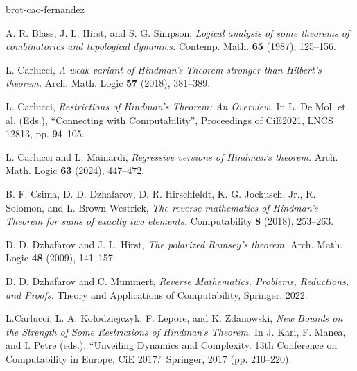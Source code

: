 \documentclass[11pt]{amsart}
\theoremstyle{definition}
\begin{document}
\begin{thebibliography}{brot-cao-fernandez}

A. R. Blass, J. L. Hirst, and S. G. Simpson,
{\em Logical analysis of some theorems of combinatorics and topological dynamics.}
Contemp. Math.
{\bf 65} (1987), 125--156.

L. Carlucci,
{\em A weak variant of Hindman's Theorem stronger than Hilbert's theorem.}
Arch. Math. Logic
{\bf 57} (2018), 381--389.

L. Carlucci,
{\em Restrictions of Hindman's Theorem: An Overview.}
In L. De Mol. et al. (Eds.),
``Connecting with Computability'', Proceedings of CiE2021,
LNCS 12813, pp. 94--105.

L. Carlucci and L. Mainardi,
{\em Regressive versions of Hindman's theorem.}
Arch. Math. Logic
{\bf 63} (2024), 447--472.

B. F. Csima, D. D. Dzhafarov, D. R. Hirschfeldt, K. G. Jockusch, Jr., R. Solomon, and L. Brown Westrick,
{\em The reverse mathematics of Hindman's Theorem for sums of exactly two elements.}
Computability
{\bf 8} (2018), 253--263.

D. D. Dzhafarov and J. L. Hirst,
{\em The polarized Ramsey's theorem.}
Arch. Math. Logic
{\bf 48} (2009), 141--157.


D. D. Dzhafarov and C. Mummert,
{\em Reverse Mathematics. Problems, Reductions, and Proofs.}
Theory and Applications of Computability,
Springer, 2022.


L.Carlucci, L. A. Ko\l{}odziejczyk, F. Lepore, and K. Zdanowski,
{\em New Bounds on the Strength of Some Restrictions of Hindman’s Theorem.}
In J. Kari, F. Manea, and I. Petre (eds.), ``Unveiling Dynamics and Complexity. 13th Conference on Computability in Europe, CiE 2017.''
Springer, 2017 (pp. 210--220).


\end{thebibliography}
\end{document}
